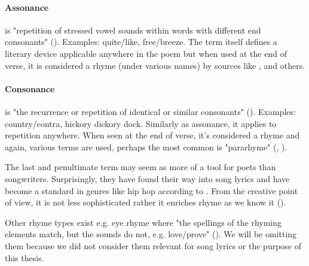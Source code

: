 \paragraph{Assonance} is "repetition of stressed vowel sounds within words with different end consonants" (\cite{britannica}). Examples:	quite/like, free/breeze. The term itself defines a literary device applicable anywhere in the poem but when used at the end of verse, it is considered a rhyme (under various names) by sources like \cite{vanphonological}, \cite{bergman2017litcharts} and others.

\paragraph{Consonance} is "the recurrence or repetition of identical or similar consonants" (\cite{britannica}). Examples: country/contra, hickory dickory dock. Similarly as assonance, it applies to repetition anywhere. When seen at the end of verse, it's considered a rhyme and again, various terms are used, perhaps the most common is "pararhyme" (\cite{britannica}, \cite{oxforddict2008literary}).\newline


The last and penultimate term may seem as more of a tool for poets than songwriters. Surprisingly, they have found their way into song lyrics and have become a standard in genres like hip hop according to \cite{vanphonological}. From the creative point of view, it is not less sophisticated rather it enriches rhyme as we know it (\cite{brogan2016poeticterms}).

Other rhyme types exist e.g. eye rhyme where "the spellings of the rhyming elements match, but the sounds do not, e.g. love/prove" (\cite{oxforddict2008literary}). We will be omitting them because we did not consider them relevant for song lyrics or the purpose of this thesis.



